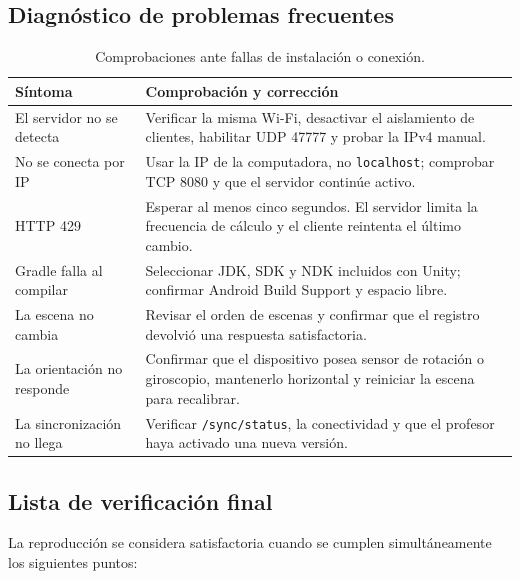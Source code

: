 \subsection{Diagnóstico de problemas frecuentes}

\begin{table}[H]
\centering
\caption{Comprobaciones ante fallas de instalación o conexión.}
\label{tab:diagnostico-instalacion}
{\small
\begin{tabular}{ll}
\toprule
\parbox[t]{4.2cm}{\textbf{Síntoma}} & \parbox[t]{9.3cm}{\textbf{Comprobación y corrección}} \\
\midrule
\parbox[t]{4.2cm}{El servidor no se detecta} & \parbox[t]{9.3cm}{Verificar la misma Wi-Fi, desactivar el aislamiento de clientes, habilitar UDP 47777 y probar la IPv4 manual.} \\
\parbox[t]{4.2cm}{No se conecta por IP} & \parbox[t]{9.3cm}{Usar la IP de la computadora, no \texttt{localhost}; comprobar TCP 8080 y que el servidor continúe activo.} \\
\parbox[t]{4.2cm}{HTTP 429} & \parbox[t]{9.3cm}{Esperar al menos cinco segundos. El servidor limita la frecuencia de cálculo y el cliente reintenta el último cambio.} \\
\parbox[t]{4.2cm}{Gradle falla al compilar} & \parbox[t]{9.3cm}{Seleccionar JDK, SDK y NDK incluidos con Unity; confirmar Android Build Support y espacio libre.} \\
\parbox[t]{4.2cm}{La escena no cambia} & \parbox[t]{9.3cm}{Revisar el orden de escenas y confirmar que el registro devolvió una respuesta satisfactoria.} \\
\parbox[t]{4.2cm}{La orientación no responde} & \parbox[t]{9.3cm}{Confirmar que el dispositivo posea sensor de rotación o giroscopio, mantenerlo horizontal y reiniciar la escena para recalibrar.} \\
\parbox[t]{4.2cm}{La sincronización no llega} & \parbox[t]{9.3cm}{Verificar \texttt{/sync/status}, la conectividad y que el profesor haya activado una nueva versión.} \\
\bottomrule
\end{tabular}}
\end{table}

\newpage
\thispagestyle{fancy}
\subsection{Lista de verificación final}

La reproducción se considera satisfactoria cuando se cumplen simultáneamente los
siguientes puntos:

